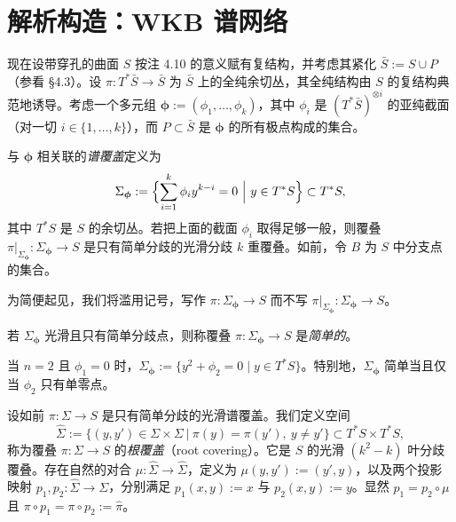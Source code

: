 
\section{解析构造：WKB 谱网络}

现在设带穿孔的曲面 $S$ 按注 4.10 的意义赋有复结构，并考虑其紧化 $\bar S:=S\cup P$（参看 §4.3）。设 $\pi\colon T^*\bar S\to\bar S$ 为 $\bar S$ 上的全纯余切丛，其全纯结构由 $S$ 的复结构典范地诱导。考虑一个多元组 $\boldsymbol\phi:=(\phi_1,\dots,\phi_k)$，其中 $\phi_i$ 是 $(T^*\bar S)^{\otimes i}$ 的亚纯截面（对一切 $i\in\{1,\dots,k\}$），而 $P\subset\bar S$ 是 $\boldsymbol\phi$ 的所有极点构成的集合。

与 $\boldsymbol\phi$ 相关联的\emph{谱覆盖}定义为
\[
\Sigma_{\boldsymbol\phi}:=\Bigl\{\sum_{i=1}^{k}\phi_i y^{k-i}=0\ \Big|\ y\in T^*S\Bigr\}\subset T^*S,
\]
其中 $T^*S$ 是 $S$ 的余切丛。若把上面的截面 $\phi_i$ 取得足够一般，则覆叠 $\pi|_{\Sigma_{\boldsymbol\phi}}\colon\Sigma_{\boldsymbol\phi}\to S$ 是只有简单分歧的光滑分歧 $k$ 重覆叠。如前，令 $B$ 为 $S$ 中分支点的集合。

\begin{remark}[13.21]
为简便起见，我们将滥用记号，写作 $\pi\colon\Sigma_{\boldsymbol\phi}\to S$ 而不写 $\pi|_{\Sigma_{\boldsymbol\phi}}\colon\Sigma_{\boldsymbol\phi}\to S$。
\end{remark}

\begin{definition}[13.22]
若 $\Sigma_{\boldsymbol\phi}$ 光滑且只有简单分歧点，则称覆叠 $\pi\colon\Sigma_{\boldsymbol\phi}\to S$ 是\emph{简单的}。
\end{definition}

\begin{remark}[13.23]
当 $n=2$ 且 $\phi_1=0$ 时，$\Sigma_{\boldsymbol\phi}:=\{y^2+\phi_2=0\mid y\in T^*S\}$。特别地，$\Sigma_{\boldsymbol\phi}$ 简单当且仅当 $\phi_2$ 只有单零点。
\end{remark}


设如前 $\pi\colon\Sigma\to S$ 是只有简单分歧的光滑谱覆盖。我们定义空间
\[
\hat\Sigma:=\bigl\{(y,y')\in\Sigma\times\Sigma\ \big|\ \pi(y)=\pi(y'),\ y\neq y'\bigr\}\subset T^*S\times T^*S,
\]
称为覆叠 $\pi\colon\Sigma\to S$ 的\emph{根覆盖}（root covering）。它是 $S$ 的光滑 $(k^2-k)$ 叶分歧覆叠。存在自然的对合 $\mu\colon\hat\Sigma\to\hat\Sigma$，定义为 $\mu(y,y'):=(y',y)$，以及两个投影映射 $p_1,p_2\colon\hat\Sigma\to\Sigma$，分别满足 $p_1(x,y):=x$ 与 $p_2(x,y):=y$。显然 $p_1=p_2\circ\mu$ 且 $\pi\circ p_1=\pi\circ p_2:=\hat\pi$。

